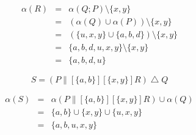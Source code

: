 \documentclass{scrreprt}
\begin{document}
\begin{eqnarray*}
  \alpha(R) &=& \alpha(Q; P) \setminus \{x, y\} \\
            &=& (\alpha(Q) \cup \alpha(P)) \setminus \{x, y\} \\
            &=& (\{u, x, y\} \cup \{a, b, d\}) \setminus \{x, y\} \\
            &=& \{a, b, d, u, x, y\} \setminus \{x, y\} \\
            &=& \{a, b, d, u\}
\end{eqnarray*}

\begin{equation}
  S = (P \parallel[\{a, b\}][\{x, y\}] R) \bigtriangleup Q
\end{equation}

\begin{eqnarray*}
  \alpha(S) &=& \alpha(P \parallel[\{a, b\}][\{x, y\}] R) \cup \alpha(Q) \\
            &=& \{a, b\} \cup \{x, y\} \cup \{u, x, y\} \\
            &=& \{a, b, u, x, y\}
\end{eqnarray*}
\end{document}
